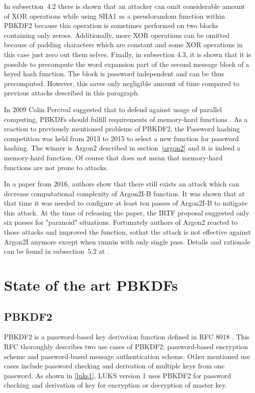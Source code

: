 \documentclass[nolof]{fithesis3}
\begin{document}
In \parencite{pbkdf2weakness}{subsection~4.2} there is shown that an attacker can omit considerable amount of XOR operations while using SHA1 as a pseudorandom function within PBKDF2 because this operation is sometimes performed on two blocks containing only zeroes. Additionally, more XOR operations can be omitted because of padding characters which are constant and some XOR operations in this case just zero out them selves. Finally, in subsection 4.3, it is shown that it is possible to precompute the word expansion part of the second message block of a keyed hash function. The block is password independent and can be thus precomputed. However, this saves only negligible amount of time compared to previous attacks described in this paragraph.

In 2009 Colin Percival suggested that to defend against usage of parallel computing, PBKDFs should fulfill requirements of memory-hard functions \parencite{memoryhard}.   As a reaction to previously mentioned problems of PBKDF2, the Password hashing competition was held from 2013 to 2015 to select a new function for password hashing. The winner is Argon2 described in section~\ref{argon2} and it is indeed a memory-hard function. Of course that does not mean that memory-hard functions are not prone to attacks.

In a paper from 2016, authors show that there still exists an attack which can decrease computational complexity of Argon2I-B function. It was shown that at that time it was needed to configure at least ten passes of Argon2I-B to mitigate this attack. At the time of releasing the paper, the IRTF proposal suggested only six passes for "paranoid" situations. Fortunately authors of Argon2 reacted to those attacks and improved the function, sothat the attack is not effective against Argon2I anymore except when runnin with only single pass. Details and rationale can be found in subsection~5.2  at \parencite{argon2}.

\chapter{State of the art PBKDFs}
\label{chap:pbkdfs}

\section{PBKDF2}
\label{sec:pbkdf2}

PBKDF2 is a password-based key derivation function defined in RFC 8018 \parencite{rfc8018}. This RFC thoroughly describes two use cases of PBKDF2; password-based encryption scheme and password-based message authentication scheme. Other mentioned use cases include password checking and derivation of multiple keys from one password. As shown in \ref{luks1}, LUKS version 1 uses PBKDF2 for password checking and derivation of key for encryption or decryption of master key.
\end{document}
